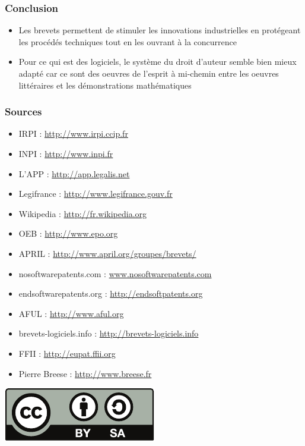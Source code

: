 \documentclass{beamer}
\begin{document}
\begin{frame}
\frametitle{Conclusion}
\begin{itemize}
	\item Les brevets permettent de stimuler les innovations industrielles en protégeant les procédés techniques tout en les ouvrant à la concurrence
	\item Pour ce qui est des logiciels, le système du droit d'auteur semble bien mieux adapté car ce sont des oeuvres de l'esprit à mi-chemin entre les oeuvres littéraires et les démonstrations mathématiques
\end{itemize}
\end{frame}

\begin{frame}
\frametitle{Sources}
\begin{itemize}
	\item IRPI : \url{http://www.irpi.ccip.fr}
	\item INPI : \url{http://www.inpi.fr}
	\item L'APP : \url{http://app.legalis.net}
	\item Legifrance : \url{http://www.legifrance.gouv.fr}
	\item Wikipedia : \url{http://fr.wikipedia.org}
	\item OEB : \url{http://www.epo.org}
	\item APRIL : \url{http://www.april.org/groupes/brevets/}
	\item nosoftwarepatents.com : \url{www.nosoftwarepatents.com}
	\item endsoftwarepatents.org : \url{http://endsoftpatents.org}
	\item AFUL : \url{http://www.aful.org}
	\item brevets-logiciels.info : \url{http://brevets-logiciels.info}
	\item FFII : \url{http://eupat.ffii.org}
	\item Pierre Breese : \url{http://www.breese.fr}
\end{itemize}
\end{frame}

\begin{frame}
\begin{center}
    \href{http://creativecommons.org/licenses/by-sa/2.0/fr/}{\includegraphics[width=.40\linewidth]{images/cc_by_sa}}
\end{center}
\end{frame}
\end{document}
